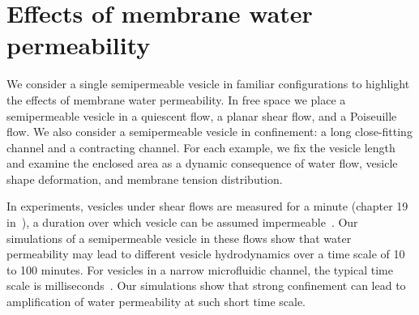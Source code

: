 \documentclass[9pt,twocolumn,twoside,lineno]{pnas-new}
\begin{document}
\section*{Effects of membrane water permeability}
We consider a single semipermeable vesicle in familiar configurations to
highlight the effects of membrane water permeability. In free space we
place a semipermeable vesicle in a quiescent flow, a planar shear flow,
and a Poiseuille flow. We also consider a semipermeable vesicle in
confinement: a long close-fitting channel and a contracting channel. For
each example, we fix the vesicle length and examine the enclosed area as
a dynamic consequence of water flow, vesicle shape deformation, and
membrane tension distribution.

In experiments, vesicles under shear flows are measured for a minute
(chapter 19 in~\cite{Dimova2020_GVB}), a duration over which vesicle can
be assumed impermeable~\cite{AbkarianViallat2005_BJ}. Our simulations of
a semipermeable vesicle in these flows show that water permeability may
lead to different vesicle hydrodynamics over a time scale of 10 to 100
minutes. 
For vesicles in a narrow microfluidic channel, the typical time scale is
milliseconds~\cite{abk-fai-sto2006}. Our simulations show that strong
confinement can lead to amplification of water permeability at such
short time scale.
%

\end{document}
